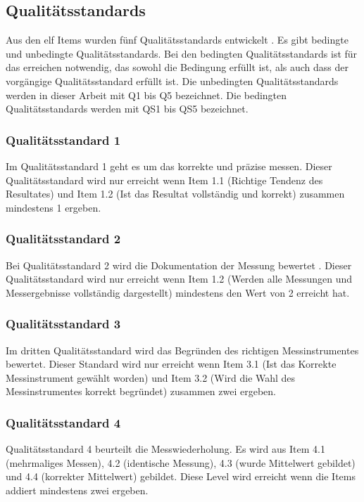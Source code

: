 \subsection{Qualitätsstandards}
Aus den elf Items wurden fünf Qualitätsstandards entwickelt \citep{Hild2014a}. Es gibt bedingte und unbedingte Qualitätsstandards. Bei den bedingten Qualitätsstandards ist für das erreichen notwendig, das sowohl die Bedingung erfüllt ist, als auch dass der vorgängige Qualitätsstandard erfüllt ist. Die unbedingten Qualitätsstandards werden in dieser Arbeit mit Q1 bis Q5 bezeichnet. Die bedingten Qualitätsstandards werden mit QS1 bis QS5 bezeichnet.
\subsubsection*{Qualitätsstandard 1}
Im Qualitätsstandard 1 geht es um das korrekte und präzise messen. Dieser Qualitätsstandard wird nur erreicht wenn Item 1.1 (Richtige Tendenz des Resultates) und Item 1.2 (Ist das Resultat vollständig und korrekt) zusammen mindestens 1 ergeben.


\subsubsection*{Qualitätsstandard 2}
Bei Qualitätsstandard 2 wird die Dokumentation der Messung bewertet . Dieser Qualitätsstandard wird nur erreicht wenn Item 1.2 (Werden alle Messungen und Messergebnisse vollständig dargestellt) mindestens den Wert von 2 erreicht hat. 

\subsubsection*{Qualitätsstandard 3}
Im dritten Qualitätsstandard wird das Begründen des richtigen Messinstrumentes bewertet. Dieser Standard wird nur erreicht wenn Item 3.1 (Ist das Korrekte Messinstrument gewählt worden) und Item 3.2 (Wird die Wahl des Messinstrumentes korrekt begründet) zusammen zwei ergeben.

\subsubsection*{Qualitätsstandard 4}
Qualitätsstandard 4 beurteilt die Messwiederholung. Es wird aus Item 4.1 (mehrmaliges Messen), 4.2 (identische Messung), 4.3 (wurde Mittelwert gebildet) und 4.4 (korrekter Mittelwert) gebildet. Diese Level wird erreicht wenn die Items addiert mindestens zwei ergeben.

